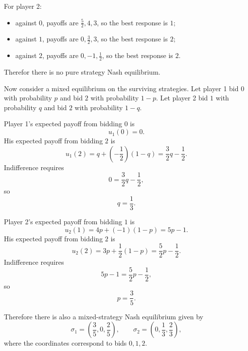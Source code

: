\documentclass[12pt,a4paper]{article}
\begin{document}
\begin{enumerate}[label=\alph*.]
  For player 2:
  \begin{itemize}
    \item against \(0\), payoffs are \(\frac52,4,3\), so the best response is \(1\);
    \item against \(1\), payoffs are \(0,\frac32,3\), so the best response is \(2\);
    \item against \(2\), payoffs are \(0,-1,\frac12\), so the best response is \(2\).
  \end{itemize}
  Therefor there is no pure strategy Nash equilibrium.

  Now consider a mixed equilibrium on the surviving strategies. Let player 1 bid \(0\) with probability \(p\) and bid \(2\) with probability \(1-p\). Let player 2 bid \(1\) with probability \(q\) and bid \(2\) with probability \(1-q\).

  Player 1's expected payoff from bidding \(0\) is
  \[
  u_1(0)=0.
  \]
  His expected payoff from bidding \(2\) is
  \[
  u_1(2)=q+(-\frac12)(1-q)=\frac32 q-\frac{1}{2}.
  \]
  Indifference requires
  \[
  0=\frac32 q-\frac12,
  \]
  so
  \[
  q=\frac13.
  \]

  Player 2's expected payoff from bidding \(1\) is
  \[
  u_2(1)=4p+(-1)(1-p)=5p-1.
  \]
  His expected payoff from bidding \(2\) is
  \[
  u_2(2)=3p+\frac12(1-p)=\frac52 p-\frac12.
  \]
  Indifference requires
  \[
  5p-1=\frac{5}{2}p-\frac{1}{2},
  \]
  so
  \[
  p=\frac35.
  \]

  Therefore there is also a mixed-strategy Nash equilibrium given by
  \[
  \sigma_1=\left(\frac35,0,\frac25\right),\qquad
  \sigma_2=\left(0,\frac13,\frac23\right),
  \]
  where the coordinates correspond to bids \(0,1,2\).
\end{enumerate}

\end{document}
